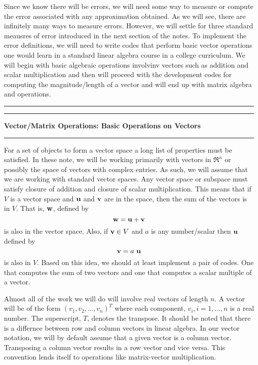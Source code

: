 \documentclass[10pt,fleqn]{article}
\begin{document}
Since we know there will be errors, we will need some way to measure or compute
the error associated with any approximation obtained. As we will see, there are
infinitely many ways to measure errors. However, we will settle for three
standard meausres of error introduced in the next section of the notes. To
implement the error definitions, we will need to write codes that perform basic
vector operations one would learn in a standard linear algebra course in a
college curriculum. We will begin with basic algebraic operations involvinv
vectors such as addition and scalar multiplication and then will proceed with
the development codes for computing the magnitude/length of a vector and will
end up with matrix algebra and operations.
\vskip0.1in\hrule\vskip0.1in
\newpage
\vskip0.1in\hrule\vskip0.1in
\noindent
{\bf Vector/Matrix Operations: Basic Operations on Vectors}
\vskip0.1in\hrule\vskip0.1in
\noindent
For a set of objects to form a vector space a long list of properties must be
satisfied. In these note, we will be working primarily with vectors in $\Re^n$
or possibly the space of vectors with complex entries. As such, we will assume
that we are working with standard vector spaces. Any vector space or subspace
must satisfy closure of addition and closure of scalar multiplication. This
means that if $V$ is a vector space and ${\bf u}$ and ${\bf v}$ are in the
space, then the sum of the vectors is in $V$. That is, ${\bf w}$, defined by
$$
  {\bf w} = {\bf u} + {\bf v}
$$
is also in the vector space. Also, if ${\bf v}\in V$ and $a$ is any 
number/scalar then ${\bf u}$ defined by
$$
  {\bf v} = a\ {\bf u}
$$
is also in $V$. Based on this idea, we should at least implement a pair of
codes. One that computes the sum of two vectors and one that computes a scalar
multiple of a vector. 

Almost all of the work we will do will involve real vectors of length $n$. A
vector will be of the form $(v_1, v_2, \ldots, v_n)^T$ where each component,
$v_i, i=1,\ldots, n$ is a real number. The superscript, $T$, denotes the
transpose. It should be noted that there is a differnce between row and column
vectors in linear algebra. In our vector notation, we will by default assume
that a given vector is a column vector. Transposing a column vector results in
a row vector and vice versa. This convention lends itself to operations like
matrix-vector multiplication. 
\end{document}
